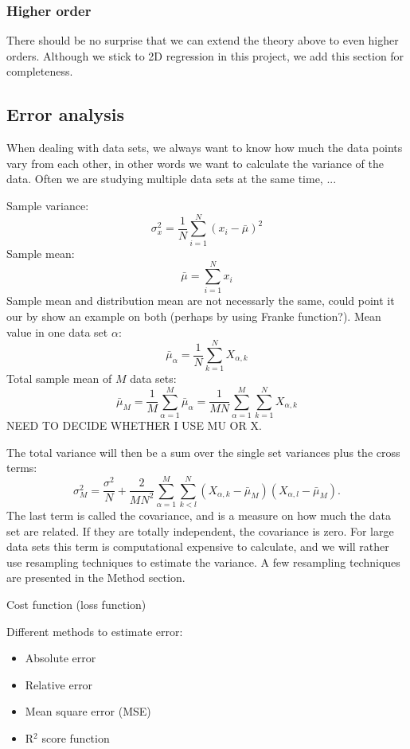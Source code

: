 \subsubsection{Higher order}
There should be no surprise that we can extend the theory above to even higher orders. 
Although we stick to 2D regression in this project, we add this section for completeness. 


\subsection{Error analysis} \label{sec:error_analysis}
When dealing with data sets, we always want to know how much the data points vary from each other, in other words we want to calculate the variance of the data. Often we are studying multiple data sets at the same time, ...

Sample variance:
\begin{equation}
\sigma_x^2=\frac{1}{N}\sum_{i=1}^N(x_i-\bar{\mu})^2
\end{equation}
Sample mean:
\begin{equation}
\bar{\mu}=\sum_{i=1}^Nx_i
\end{equation}
Sample mean and distribution mean are not necessarly the same, could point it our by show an example on both (perhaps by using Franke function?).
Mean value in one data set $\alpha$:
\begin{equation}
\bar{\mu}_{\alpha}=\frac{1}{N}\sum_{k=1}^NX_{\alpha,k}
\end{equation}
Total sample mean of $M$ data sets:
\begin{equation}
\bar{\mu}_M=\frac{1}{M}\sum_{\alpha=1}^M\bar{\mu}_{\alpha}=\frac{1}{MN}\sum_{\alpha=1}^M\sum_{k=1}^NX_{\alpha,k}
\end{equation}
NEED TO DECIDE WHETHER I USE MU OR X.

The total variance will then be a sum over the single set variances plus the cross terms:
\begin{equation}
\sigma_M^2=\frac{\sigma^2}{N}+\frac{2}{MN^2}\sum_{\alpha=1}^M\sum_{k<l}^N(X_{\alpha,k}-\bar{\mu}_M)(X_{\alpha,l}-\bar{\mu}_M).
\end{equation}
The last term is called the covariance, and is a measure on how much the data set are related. If they are totally independent, the covariance is zero. For large data sets this term is computational expensive to calculate, and we will rather use resampling techniques to estimate the variance. A few resampling techniques are presented in the Method section.

Cost function (loss function) 

Different methods to estimate error:
\begin{itemize}
\item{Absolute error}
\item{Relative error}
\item{Mean square error (MSE)}
\item{R$^2$ score function}
\end{itemize}

